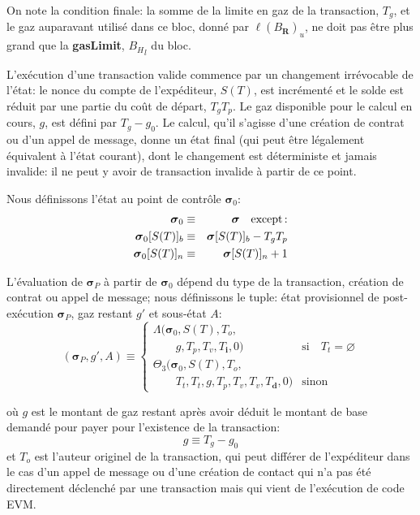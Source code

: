 \documentclass[9pt,oneside]{amsart}
\begin{document}
\begin{multicols}{2}
On note la condition finale: la somme de la limite en gaz de la transaction, $T_g$, et le gaz auparavant utilisé dans ce bloc, donné par $\ell(B_\mathbf{R})_u$, ne doit pas être plus grand que la \textbf{gasLimit}, ${B_H}_l$ du bloc.

L'exécution d'une transaction valide commence par un changement irrévocable de l'état: le nonce du compte de l'expéditeur, $S(T)$, est incrémenté et le solde est réduit par une partie du coût de départ, $T_gT_p$. Le gaz disponible pour le calcul en cours, $g$, est défini par $T_g - g_0$. Le calcul, qu'il s'agisse d'une création de contrat ou d'un appel de message, donne un état final (qui peut être légalement équivalent à l'état courant), dont le changement est déterministe et jamais invalide: il ne peut y avoir de transaction invalide à partir de ce point.

Nous définissons l'état au point de contrôle $\boldsymbol{\sigma}_0$:
\begin{eqnarray}
\boldsymbol{\sigma}_0 & \equiv & \boldsymbol{\sigma} \quad \text{except\,:} \\
\boldsymbol{\sigma}_0[S(T)]_b & \equiv & \boldsymbol{\sigma}[S(T)]_b - T_g T_p \\
\boldsymbol{\sigma}_0[S(T)]_n & \equiv & \boldsymbol{\sigma}[S(T)]_n + 1
\end{eqnarray}

L'évaluation de $\boldsymbol{\sigma}_P$ à partir de $\boldsymbol{\sigma}_0$ dépend du type de la transaction, création de contrat ou appel de message; nous définissons le tuple: état provisionnel de post-exécution $\boldsymbol{\sigma}_P$, gaz restant $g'$ et sous-état $A$:
\begin{equation}
(\boldsymbol{\sigma}_P, g', A) \equiv \begin{cases}
\Lambda(\boldsymbol{\sigma}_0, S(T), T_o, &\\ \quad\quad g, T_p, T_v, T_\mathbf{i}, 0) & \text{si} \quad T_t = \varnothing \\
\Theta_{3}(\boldsymbol{\sigma}_0, S(T), T_o, &\\ \quad\quad T_t, T_t, g, T_p, T_v, T_v, T_\mathbf{d}, 0) & \text{sinon}
\end{cases}
\end{equation}

où $g$ est le montant de gaz restant après avoir déduit le montant de base demandé pour payer pour l'existence de la transaction:
\begin{equation}
g \equiv T_g - g_0
\end{equation}
et $T_o$ est l'auteur originel de la transaction, qui peut différer de l'expéditeur dans le cas d'un appel de message ou d'une création de contact qui n'a pas été directement déclenché par une transaction mais qui vient de l'exécution de code EVM.


\end{multicols}
\end{document}

